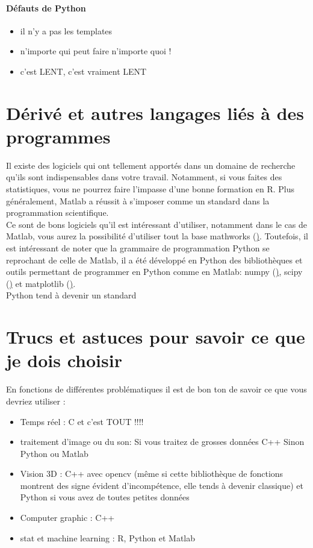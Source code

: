 \documentclass[a4paper,10pt]{book_ad}
\begin{document}
\paragraph{Défauts de Python}
\begin{itemize}
\item il n'y a pas les templates
\item n'importe qui peut faire n'importe quoi !
\item c'est LENT, c'est vraiment LENT
\end{itemize}

\section{Dérivé et autres langages liés à des programmes}

Il existe des logiciels qui ont tellement apportés dans un domaine de recherche qu'ils sont 
indispensables dans votre travail. Notamment, si vous faites des statistiques, vous ne pourrez
 faire l'impasse d'une bonne formation en R. Plus généralement, Matlab a réussit à s'imposer 
comme un standard dans la programmation scientifique.\\

Ce sont de bons logiciels qu'il est intéressant d'utiliser, notamment dans le cas de Matlab, 
vous aurez la possibilité d'utiliser tout la base mathworks 
(\href{http://www.mathworks.fr/matlabcentral/fileexchange}). Toutefois, il est intéressant 
de noter que la grammaire de programmation Python se reprochant de celle de Matlab, il a 
été développé en Python des bibliothèques et outils permettant de programmer en Python comme en Matlab: 
numpy (\href{http://www.numpy.org/}),
 scipy (\href{http://www.scipy.org/}) et matplotlib (\href{http://matplotlib.org/}).\\

Python tend à devenir un standard 


\section{Trucs et astuces pour savoir ce que je dois choisir}

En fonctions de différentes problématiques il est de bon ton de savoir ce que vous devriez utiliser :

\begin{itemize}
\item Temps réel : C et c'est TOUT !!!!
\item traitement d'image ou du son: Si vous traitez de grosses données C++ Sinon Python ou Matlab
\item Vision 3D : C++ avec opencv (même si cette bibliothèque de fonctions montrent des signe 
évident d'incompétence, elle tends à devenir classique) et Python si vous avez de toutes petites données
\item Computer graphic : C++ 
\item stat et machine learning : R, Python et Matlab
\end{itemize}  
\end{document}
